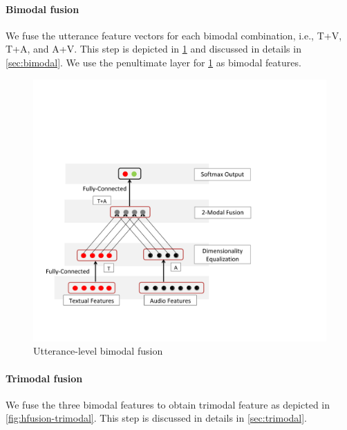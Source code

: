 \documentclass[review]{elsarticle}
\newcommand\?[1]{\hl{#1}}
\begin{document}
\paragraph{Bimodal fusion}
We fuse the utterance feature vectors for each bimodal combination, i.e., T+V,
T+A, and A+V. This step is depicted in \cref{fig:hfusion-bimodal} and discussed
in details in \cref{sec:bimodal}.
%
We use the penultimate layer for \cref{fig:hfusion-bimodal} as bimodal features.

\begin{figure}[ht]
    \centering
    \includegraphics[scale=0.46]{./hfusion-2-modal-trimmed.pdf}
    \caption{Utterance-level bimodal fusion}
    \label{fig:hfusion-bimodal}
\end{figure}

\paragraph{Trimodal fusion}
We fuse the three bimodal features to obtain trimodal feature as depicted in
\cref{fig:hfusion-trimodal}. This step is discussed in details in \cref{sec:trimodal}.
\end{document}
